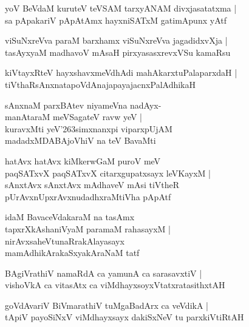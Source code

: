 \documentclass[twoside,12pt,openright]{book}
\def\S{\char'263}
\newcounter{shloka}[chapter]
\begin{document}
\begin{shloka}%
yoV BeVdaM kuruteV teVSAM tarxyANAM divxjasatatxma |\\
sa pApakariV pApAtAmx hayxniSATxM gatimApunx yAtf
\end{shloka}

\begin{shloka}%
viSuNxreVva paraM barxhamx viSuNxreVva jagadidxvXja |\\
tasAyxyaM madhavoV mAsaH pirxyasasxrevxVSu kamaRsu 
\end{shloka}

\begin{shloka}%
kiVtayxRteV hayxshavxmeVdhAdi mahAkarxtuPalaparxdaH |\\
tiVthaRsAnxnatapoVdAnajapayajacnxPalAdhikaH
\end{shloka}

\begin{shloka}%
sAnxnaM parxBAtev niyameVna nadAyx-\\
manAtaraM meVSagateV ravw yeV |\\
kuravxMti yeV\S simxnanxpi viparxpUjAM \\
madadxMDABAjoVhiV na teV BavaMti 
\end{shloka}

\begin{shloka}%
hatAvx hatAvx kiMkerwGaM puroV meV \\
paqSATxvX paqSATxvX citarxgupatxsayx leVKayxM |\\
sAnxtAvx sAnxtAvx mAdhaveV mAsi tiVtheR \\
pUrAvxnUpxrAvxnudadhxraMtiVha pApAtf
\end{shloka}

\begin{shloka}%
idaM BavaceVdakaraM na tasAmx \\
tapxrXkAshaniVyaM paramaM rahasayxM |\\
nirAvxsaheVtunaRrakAlayasayx \\
mamAdhikArakaSxyakAraNaM tatf
\end{shloka}

\begin{shloka}%
BAgiVrathiV namaRdA ca yamunA ca sarasavxtiV |\\
vishoVkA ca vitasAtx ca viMdhayxsoyxVtatxratasithxtAH 
\end{shloka}

\begin{shloka}%
goVdAvariV BiVmarathiV tuMgaBadArx ca veVdikA |\\
tApiV payoSiNxV viMdhayxsayx dakiSxNeV tu parxkiVtiRtAH 
\end{shloka}
\end{document}
